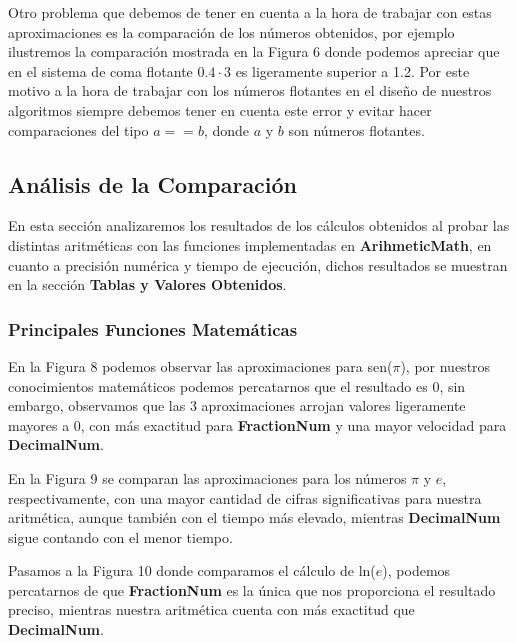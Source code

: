 \documentclass[a4paper,10pt,twocolumn]{article}
\begin{document}
	Otro problema que debemos de tener en cuenta a la hora de trabajar con estas aproximaciones es la comparación de los números obtenidos, por ejemplo ilustremos la comparación mostrada en la Figura 6 donde podemos apreciar que en el sistema de coma flotante $0.4\cdot 3$ es ligeramente superior a 1.2. Por este motivo a la hora de trabajar con los números flotantes en el diseño de nuestros algoritmos siempre debemos tener en cuenta este error y evitar hacer comparaciones del tipo $a==b$, donde $a$ y $b$ son números flotantes.


\subsection{Análisis de la Comparación}\label{sub:comp}

	En esta sección analizaremos los resultados de los cálculos obtenidos al probar las distintas aritméticas con las funciones implementadas en \textbf{ArihmeticMath}, en cuanto a precisión numérica y tiempo de ejecución, dichos resultados se muestran en la sección \textbf{Tablas y Valores Obtenidos}.
	
\subsubsection{Principales Funciones Matemáticas}\label{sub:math_func}

	
	En la Figura 8 podemos observar las aproximaciones para sen($\pi$), por nuestros conocimientos matemáticos podemos percatarnos que el resultado es 0, sin embargo, observamos que las 3 aproximaciones arrojan valores ligeramente mayores a 0, con más exactitud para \textbf{FractionNum} y una mayor velocidad para \textbf{DecimalNum}.

	En la Figura 9 se comparan las aproximaciones para los números $\pi$ y $e$, respectivamente, con una mayor cantidad de cifras significativas para nuestra aritmética, aunque también con el tiempo más elevado, mientras \textbf{DecimalNum} sigue contando con el menor tiempo. 
	
	Pasamos a la Figura 10 donde comparamos el cálculo de ln($e$), podemos percatarnos de que \textbf{FractionNum} es la única que nos proporciona el resultado preciso, mientras nuestra aritmética cuenta con más exactitud que \textbf{DecimalNum}.
	
\end{document}
